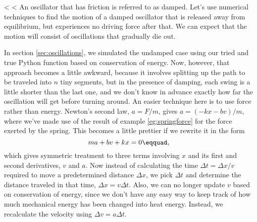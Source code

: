 <%
        <%
        An oscillator that has friction is referred to as
        damped.
        Let's use numerical techniques to find the motion of a damped
        oscillator that is released away from equilibrium, but experiences
        no driving force after that. We can expect that the motion will consist
        of oscillations that gradually die out.

        In section \ref{sec:oscillations}, we simulated the undamped case using
        our tried and true Python function based on conservation of energy. Now,
        however, that approach becomes a little awkward, because it involves
        splitting up the path to be traveled into $n$ tiny segments, but in the presence of damping,
        each swing is a little shorter than the last one, and
        we don't know in advance exactly how far the oscillation will get before turning around.
        An easier technique here is to use force rather than energy.
        Newton's second law, $a=F/m$, gives $a=(-kx-bv)/m$, where we've made use
        of the result of example \ref{eg:springforce} for the force exerted by the spring.
        This becomes a little prettier if we rewrite it in the form
        \begin{equation*}
                ma+bv+kx = 0\eqquad,
        \end{equation*}
        which gives symmetric treatment to three terms involving $x$ and its first and
        second derivatives, $v$ and $a$. Now instead of calculating the time $\Delta{}t=\Delta{}x/v$
        required to move a predetermined distance $\Delta{}x$, we pick $\Delta{}t$ and
        determine the distance traveled in that time, $\Delta{}x=v\Delta{}t$. Also, we can
        no longer update $v$ based on conservation of energy, since we don't have any
        easy way to keep track of how much mechanical energy has been changed into
        heat energy. Instead, we recalculate the velocity using $\Delta{}v=a\Delta{}t$.
